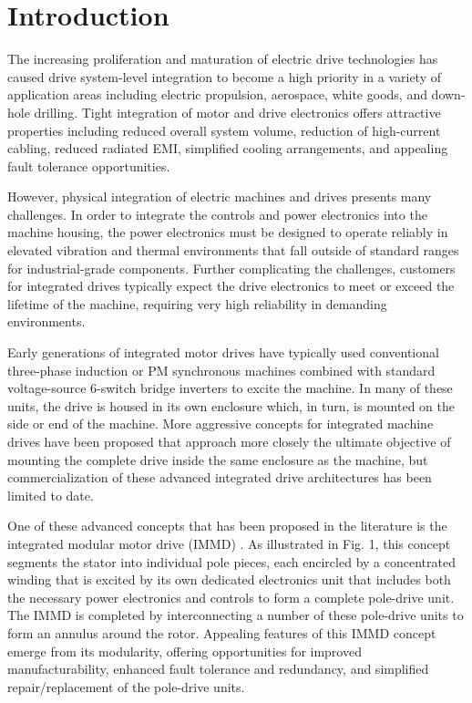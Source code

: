 \chapter{Introduction}
The increasing proliferation and maturation of electric drive technologies has
caused drive system-level integration to become a high priority in a variety
of application areas including electric propulsion, aerospace, white goods,
and down-hole drilling.
Tight integration of motor and drive electronics
offers attractive properties including reduced overall system volume,
reduction of high-current cabling, reduced radiated EMI, simplified cooling
arrangements, and appealing fault tolerance opportunities.

However, physical integration of electric machines and drives presents many
challenges.
In order to integrate the controls and power electronics into the
machine housing, the power electronics must be designed to operate reliably in
elevated vibration and thermal environments that fall outside of standard
ranges for industrial-grade components.
Further complicating the
challenges, customers for integrated drives typically expect the drive
electronics to meet or exceed the lifetime of the machine, requiring very high
reliability in demanding environments.

Early generations of integrated motor drives have typically used conventional
three-phase induction or PM synchronous machines combined with standard
voltage-source 6-switch bridge inverters to excite the machine.
In many of these units, the drive is housed in its own enclosure which, in
turn, is mounted on the side or end of the machine.
More aggressive concepts for integrated machine drives have been proposed that
approach more closely the ultimate objective of mounting the complete drive
inside the same enclosure as the machine, but commercialization of these
advanced integrated drive architectures has been limited to date.

One of these advanced concepts that has been proposed in the literature is the
integrated modular motor drive (IMMD) .
As illustrated in Fig. 1, this
concept segments the stator into individual pole pieces, each encircled by a
concentrated winding that is excited by its own dedicated electronics unit
that includes both the necessary power electronics and controls to form a
complete pole-drive unit.
The IMMD is completed by interconnecting a number
of these pole-drive units to form an annulus around the rotor.
Appealing features of this IMMD concept emerge from its modularity, offering
opportunities for improved manufacturability, enhanced fault tolerance and
redundancy, and simplified repair/replacement of the pole-drive units.

